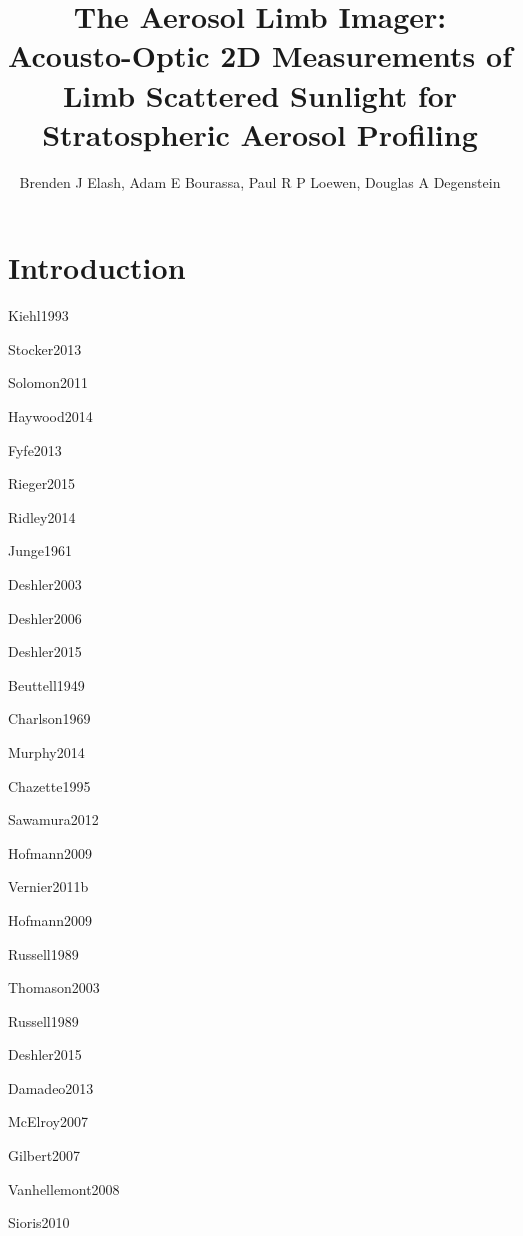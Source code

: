 \documentclass[12pt]{article}
\title{The Aerosol Limb Imager: Acousto-Optic 2D Measurements of Limb Scattered Sunlight for Stratospheric Aerosol Profiling}
\author{Brenden J Elash, Adam E Bourassa, Paul R P Loewen, Douglas A Degenstein}
\begin{document}
\renewcommand\bibname{BiBTex.bib}

\maketitle

\abstract{}

\section{Introduction}
\label{sec:introduction}

Kiehl1993 \citep{Kiehl1993}

Stocker2013 \citep{Stocker2013}

Solomon2011 \citep{Solomon2011}

Haywood2014 \citep{Haywood2014}

Fyfe2013 \citep{Fyfe2013}

Rieger2015 \citep{Rieger2015}

Ridley2014 \citep{Ridley2014}

Junge1961 \citep{Junge1961}

Deshler2003 \citep{Deshler2003}

Deshler2006 \citep{Deshler2006}

Deshler2015 \citep{Deshler2015?}

Beuttell1949 \citep{Beuttell1949}

Charlson1969 \citep{Charlson1969}

Murphy2014 \citep{Murphy2014}

Chazette1995 \citep{Chazette1995}

Sawamura2012 \citep{Sawamura2012}

Hofmann2009 \citep{Hofmann2009}

Vernier2011b \citep{Vernier2011b}

Hofmann2009 \citep{Hofmann2009}

Russell1989 \citep{Russell1989}

Thomason2003 \citep{Thomason2003}

Russell1989 \citep{Russell1989}

Deshler2015 \citep{Deshler2015?}

Damadeo2013 \citep{Damadeo2013}

McElroy2007 \citep{McElroy2007}

Gilbert2007 \citep{Gilbert2007}

Vanhellemont2008 \citep{Vanhellemont2008}

Sioris2010 \citep{Sioris2010}
\end{document}
